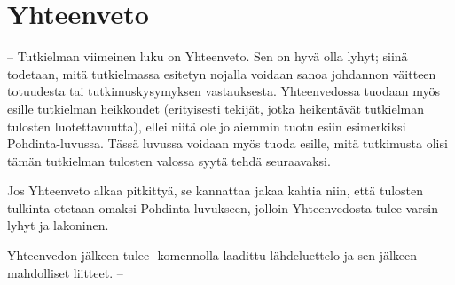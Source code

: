 \documentclass[utf8]{gradu3}
\begin{document}
\chapter{Yhteenveto}

-- Tutkielman viimeinen luku on Yhteenveto.  Sen on hyvä olla lyhyt; siinä todetaan, mitä tutkielmassa esitetyn nojalla voidaan sanoa johdannon väitteen totuudesta tai tutkimuskysymyksen vastauksesta. Yhteenvedossa tuodaan myös esille tutkielman heikkoudet (erityisesti tekijät, jotka heikentävät tutkielman tulosten luotettavuutta), ellei niitä ole jo aiemmin tuotu esiin esimerkiksi Pohdinta-luvussa. Tässä luvussa voidaan myös tuoda esille, mitä tutkimusta olisi tämän
tutkielman tulosten valossa syytä tehdä seuraavaksi.

Jos Yhteenveto alkaa pitkittyä, se kannattaa jakaa kahtia niin, että tulosten tulkinta otetaan omaksi Pohdinta-luvukseen, jolloin Yhteenvedosta tulee varsin lyhyt ja lakoninen.

Yhteenvedon jälkeen tulee \string\printbibliography-komennolla laadittu lähdeluettelo ja sen jälkeen mahdolliset liitteet. --


\printbibliography

%

\appendix
\end{document}

